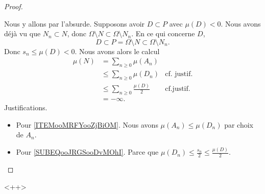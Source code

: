 \begin{proof}
\begin{subproof}
	Nous y allons par l'absurde. Supposons avoir \( D\subset P\) avec \( \mu(D)<0\). Nous avons déjà vu que \( N_n\subset N\), donc $\Omega\setminus N\subset \Omega\setminus N_n$. En ce qui concerne \( D\),
	\begin{equation}
	D\subset P=\Omega\setminus N\subset \Omega\setminus N_n.
	\end{equation}
	Donc \( s_n\leq \mu(D)<0\). Nous avons alors le calcul
	\begin{subequations}
	\begin{align}
	\mu(N) & =\sum_{n\geq 0}\mu(A_n)                                                                \\
						& \leq \sum_{n\geq 0}\mu(D_n)           & \text{cf. justif.}		\label{ITEMooMRFYooZjBiOM}   \\
						& \leq \sum_{n\geq 0}\frac{ \mu(D) }{2} & \text{cf.justif. } \label{SUBEQooJRGSooDvMOhI} \\
						& =-\infty.
						\end{align}
						\end{subequations}
						Justifications.
						\begin{itemize}
						\item
						Pour \eqref{ITEMooMRFYooZjBiOM}. Nous avons \( \mu(A_n)\leq \mu(D_n)\) par choix de \( A_n\).
						\item
						Pour \eqref{SUBEQooJRGSooDvMOhI}. Parce que
						$\mu(D_n)\leq \frac{ s_n }{2}\leq \frac{ \mu(D) }{2}$.
						\end{itemize}
						\end{subproof}
						\end{proof}<++>

